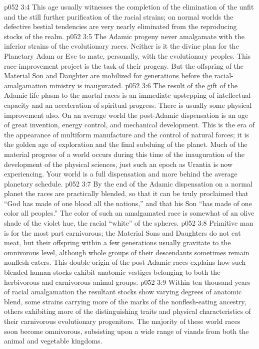 \pc \vs p052 3:4 This age usually witnesses the completion of the elimination of the unfit and the still further purification of the racial strains; on normal worlds the defective bestial tendencies are very nearly eliminated from the reproducing stocks of the realm.
\vs p052 3:5 The Adamic progeny never amalgamate with the inferior strains of the evolutionary races. Neither is it the divine plan for the Planetary Adam or Eve to mate, personally, with the evolutionary peoples. This race\hyp{}improvement project is the task of their progeny. But the offspring of the Material Son and Daughter are mobilized for generations before the racial\hyp{}amalgamation ministry is inaugurated.
\vs p052 3:6 The result of the gift of the Adamic life plasm to the mortal races is an immediate upstepping of intellectual capacity and an acceleration of spiritual progress. There is usually some physical improvement also. On an average world the post\hyp{}Adamic dispensation is an age of great invention, energy control, and mechanical development. This is the era of the appearance of multiform manufacture and the control of natural forces; it is the golden age of exploration and the final subduing of the planet. Much of the material progress of a world occurs during this time of the inauguration of the development of the physical sciences, just such an epoch as Urantia is now experiencing. Your world is a full dispensation and more behind the average planetary schedule.
\vs p052 3:7 By the end of the Adamic dispensation on a normal planet the races are practically blended, so that it can be truly proclaimed that “God has made of one blood all the nations,” and that his Son “has made of one color all peoples.” The color of such an amalgamated race is somewhat of an olive shade of the violet hue, the racial “white” of the spheres.
\pc \vs p052 3:8 Primitive man is for the most part carnivorous; the Material Sons and Daughters do not eat meat, but their offspring within a few generations usually gravitate to the omnivorous level, although whole groups of their descendants sometimes remain nonflesh eaters. This double origin of the post\hyp{}Adamic races explains how such blended human stocks exhibit anatomic vestiges belonging to both the herbivorous and carnivorous animal groups.
\vs p052 3:9 Within ten thousand years of racial amalgamation the resultant stocks show varying degrees of anatomic blend, some strains carrying more of the marks of the nonflesh\hyp{}eating ancestry, others exhibiting more of the distinguishing traits and physical characteristics of their carnivorous evolutionary progenitors. The majority of these world races soon become omnivorous, subsisting upon a wide range of viands from both the animal and vegetable kingdoms.
